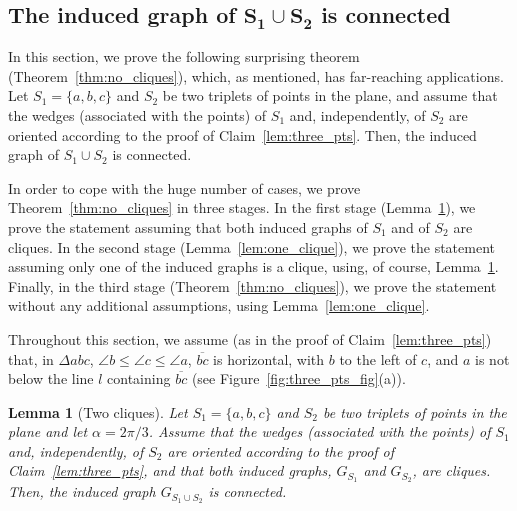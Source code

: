 \documentclass[11pt]{article}
\newtheorem{lemma}[theorem]{Lemma}
\begin{document}
\subsection{The induced graph of $\boldsymbol{S_1 \cup S_2}$ is connected}
\label{sec:main_theorem}

In this section, we prove the following surprising theorem (Theorem~\ref{thm:no_cliques}), which, as mentioned, has far-reaching applications.
Let $S_1=\{a,b,c\}$ and $S_2$ be two triplets of points in the plane, and assume that the wedges (associated with the points) of $S_1$ and, independently, of $S_2$ are oriented according to the proof of Claim~\ref{lem:three_pts}. Then, the induced graph of $S_1 \cup S_2$ is connected. 

In order to cope with the huge number of cases, we prove Theorem~\ref{thm:no_cliques} in three stages.
In the first stage (Lemma~\ref{lem:two_cliques}), we prove the statement assuming that both induced graphs of $S_1$ and of $S_2$ are cliques. In the second stage (Lemma~\ref{lem:one_clique}), we prove the statement assuming only one of the induced graphs is a clique, using, of course, Lemma~\ref{lem:two_cliques}. Finally, in the third stage (Theorem~\ref{thm:no_cliques}), we prove the statement without any additional assumptions, using Lemma~\ref{lem:one_clique}.

Throughout this section, we assume (as in the proof of Claim~\ref{lem:three_pts}) that, in $\Delta abc$, $\angle b \le \angle c \le \angle a$, $\overline{bc}$ is horizontal, with $b$ to the left of $c$, and $a$ is not below the line $l$ containing $\overline{bc}$ (see Figure~\ref{fig:three_pts_fig}(a)).     

\begin{lemma}[Two cliques]\label{lem:two_cliques}
Let $S_1=\{a,b,c\}$ and $S_2$ be two triplets of points in the plane and let $\alpha=2\pi/3$.
Assume that the wedges (associated with the points) of $S_1$ and, independently, of $S_2$ are oriented according to the proof of Claim~\ref{lem:three_pts}, and that both induced graphs, $G_{S_1}$ and $G_{S_2}$, are cliques.
Then, the induced graph $G_{S_1\cup S_2}$ is connected.
\end{lemma}
\end{document}
